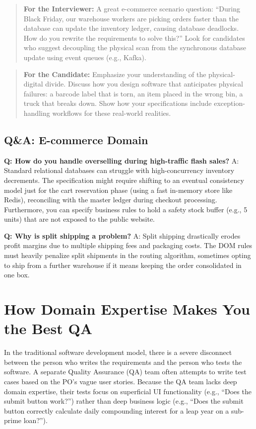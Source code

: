 \begin{quote}
\textbf{For the Interviewer:} A great e-commerce scenario question:
``During Black Friday, our warehouse workers are picking orders faster
than the database can update the inventory ledger, causing database
deadlocks. How do you rewrite the requirements to solve this?'' Look for
candidates who suggest decoupling the physical scan from the synchronous
database update using event queues (e.g., Kafka).
\end{quote}

\begin{quote}
\textbf{For the Candidate:} Emphasize your understanding of the
physical-digital divide. Discuss how you design software that
anticipates physical failures: a barcode label that is torn, an item
placed in the wrong bin, a truck that breaks down. Show how your
specifications include exception-handling workflows for these real-world
realities.
\end{quote}

\subsection{Q\&A: E-commerce Domain}\label{qa-e-commerce-domain}

\textbf{Q: How do you handle overselling during high-traffic flash
sales?} A: Standard relational databases can struggle with
high-concurrency inventory decrements. The specification might require
shifting to an eventual consistency model just for the cart reservation
phase (using a fast in-memory store like Redis), reconciling with the
master ledger during checkout processing. Furthermore, you can specify
business rules to hold a safety stock buffer (e.g., 5 units) that are
not exposed to the public website.

\textbf{Q: Why is split shipping a problem?} A: Split shipping
drastically erodes profit margins due to multiple shipping fees and
packaging costs. The DOM rules must heavily penalize split shipments in
the routing algorithm, sometimes opting to ship from a further warehouse
if it means keeping the order consolidated in one box.

\bigskip

\section{How Domain Expertise Makes You the Best
QA}\label{how-domain-expertise-makes-you-the-best-qa}

In the traditional software development model, there is a severe
disconnect between the person who writes the requirements and the person
who tests the software. A separate Quality Assurance (QA) team often
attempts to write test cases based on the PO's vague user stories.
Because the QA team lacks deep domain expertise, their tests focus on
superficial UI functionality (e.g., ``Does the submit button work?'')
rather than deep business logic (e.g., ``Does the submit button
correctly calculate daily compounding interest for a leap year on a
sub-prime loan?'').

